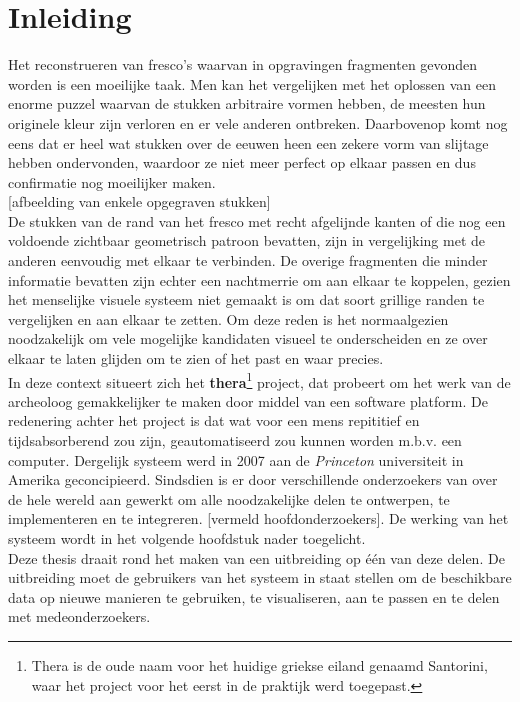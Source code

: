 \chapter{Inleiding}
\label{inleiding}
Het reconstrueren van fresco's waarvan in opgravingen fragmenten gevonden worden
is een moeilijke taak. Men kan het vergelijken met het oplossen van een enorme
puzzel waarvan de stukken arbitraire vormen hebben, de meesten hun originele
kleur zijn verloren en er vele anderen ontbreken. Daarbovenop komt nog eens dat
er heel wat stukken over de eeuwen heen een zekere vorm van slijtage hebben
ondervonden, waardoor ze niet meer perfect op elkaar passen en dus confirmatie nog moeilijker maken.\\

[afbeelding van enkele opgegraven stukken]\\

De stukken van de rand van het fresco met recht afgelijnde kanten of die nog een voldoende zichtbaar geometrisch patroon bevatten, zijn in vergelijking met de
anderen eenvoudig met elkaar te verbinden. De overige fragmenten die minder informatie bevatten zijn echter een nachtmerrie om aan elkaar te koppelen, gezien het menselijke visuele systeem niet
gemaakt is om dat soort grillige randen te vergelijken en aan elkaar te zetten. Om deze reden is het normaalgezien noodzakelijk om vele mogelijke kandidaten visueel
te onderscheiden en ze over elkaar te laten glijden om te zien of het past en waar precies.\\

In deze context situeert zich het \textbf{thera}\footnote{Thera is de oude naam voor het huidige griekse eiland genaamd Santorini, waar het project voor het eerst in de praktijk werd toegepast.} project, dat probeert om het werk van de archeoloog gemakkelijker te maken door middel van een software platform. De
redenering achter het project is dat wat voor een mens repititief en tijdsabsorberend zou zijn, geautomatiseerd zou kunnen worden m.b.v. een computer. Dergelijk systeem werd in 2007 aan de \emph{Princeton} universiteit in Amerika geconcipieerd. Sindsdien is er door verschillende onderzoekers van over de hele wereld aan gewerkt om alle noodzakelijke delen te ontwerpen, te implementeren en te integreren. [vermeld hoofdonderzoekers]. De werking van het systeem wordt in het 
volgende hoofdstuk nader toegelicht.\\

Deze thesis draait rond het maken van een uitbreiding op \'{e}\'{e}n van deze delen. De uitbreiding moet de gebruikers van het systeem in staat stellen om de beschikbare data op nieuwe manieren te gebruiken, te visualiseren, aan te passen en te delen met medeonderzoekers.\\

